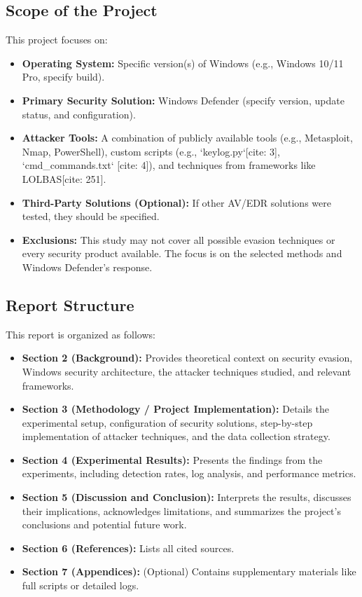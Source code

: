 \documentclass[11pt]{article}
\begin{document}
	\subsection{Scope of the Project}
	This project focuses on:
	\begin{itemize}
		\item \textbf{Operating System:} Specific version(s) of Windows (e.g., Windows 10/11 Pro, specify build).
		\item \textbf{Primary Security Solution:} Windows Defender (specify version, update status, and configuration).
		\item \textbf{Attacker Tools:} A combination of publicly available tools (e.g., Metasploit, Nmap, PowerShell), custom scripts (e.g., `keylog.py`[cite: 3], `cmd\_commands.txt` [cite: 4]), and techniques from frameworks like LOLBAS[cite: 251].
		\item \textbf{Third-Party Solutions (Optional):} If other AV/EDR solutions were tested, they should be specified.
		\item \textbf{Exclusions:} This study may not cover all possible evasion techniques or every security product available. The focus is on the selected methods and Windows Defender's response.
	\end{itemize}
	
	\subsection{Report Structure}
	This report is organized as follows:
	\begin{itemize}
		\item \textbf{Section 2 (Background):} Provides theoretical context on security evasion, Windows security architecture, the attacker techniques studied, and relevant frameworks.
		\item \textbf{Section 3 (Methodology / Project Implementation):} Details the experimental setup, configuration of security solutions, step-by-step implementation of attacker techniques, and the data collection strategy.
		\item \textbf{Section 4 (Experimental Results):} Presents the findings from the experiments, including detection rates, log analysis, and performance metrics.
		\item \textbf{Section 5 (Discussion and Conclusion):} Interprets the results, discusses their implications, acknowledges limitations, and summarizes the project's conclusions and potential future work.
		\item \textbf{Section 6 (References):} Lists all cited sources.
		\item \textbf{Section 7 (Appendices):} (Optional) Contains supplementary materials like full scripts or detailed logs.
	\end{itemize}
	\newpage
	
\end{document}
